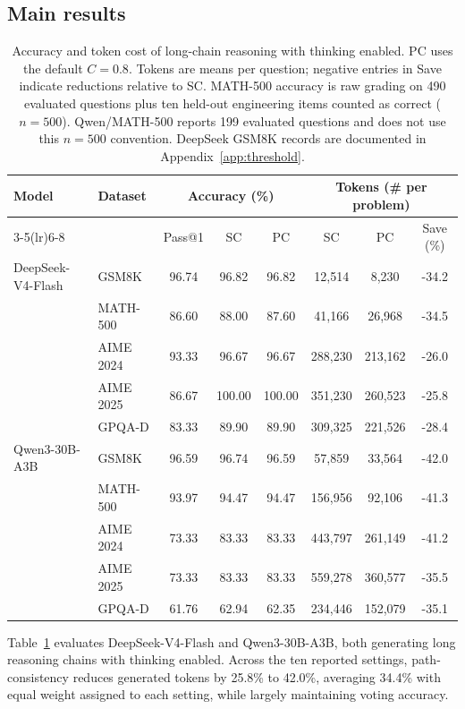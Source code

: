\subsection{Main results}
\label{sec:main_results}
\begin{table}[htbp]
\centering
\caption{Accuracy and token cost of long-chain reasoning with thinking enabled. PC uses the default $C=0.8$. Tokens are means per question; negative entries in Save indicate reductions relative to SC. MATH-500 accuracy is raw grading on 490 evaluated questions plus ten held-out engineering items counted as correct ($n=500$). Qwen/MATH-500 reports 199 evaluated questions and does not use this $n=500$ convention. DeepSeek GSM8K records are documented in Appendix~\ref{app:threshold}.}
\label{tab:main}
\setlength{\tabcolsep}{5pt}
\begin{tabular}{llcccccc}
\toprule
Model & Dataset & \multicolumn{3}{c}{Accuracy (\%)} & \multicolumn{3}{c}{Tokens (\# per problem)}\\
\cmidrule(lr){3-5}\cmidrule(lr){6-8}
 & & Pass@1 & SC & PC & SC & PC & Save (\%)\\
\midrule
DeepSeek-V4-Flash  & GSM8K & 96.74 & 96.82 & 96.82 & 12,514 & 8,230 & -34.2 \\
& MATH-500 & 86.60 & 88.00 & 87.60 & 41,166 & 26,968 & -34.5 \\
 & AIME 2024 & 93.33 & 96.67 & 96.67 & 288,230 & 213,162 & -26.0 \\
 & AIME 2025 & 86.67 & 100.00 & 100.00 & 351,230 & 260,523 & -25.8 \\
 & GPQA-D & 83.33 & 89.90 & 89.90 & 309,325 & 221,526 & -28.4 \\

\midrule
Qwen3-30B-A3B & GSM8K & 96.59 & 96.74 & 96.59 & 57,859 & 33,564 & -42.0 \\
& MATH-500 & 93.97 & 94.47 & 94.47 & 156,956 & 92,106 & -41.3 \\
 & AIME 2024 & 73.33 & 83.33 & 83.33 & 443,797 & 261,149 & -41.2 \\
 & AIME 2025 & 73.33 & 83.33 & 83.33 & 559,278 & 360,577 & -35.5 \\
 & GPQA-D & 61.76 & 62.94 & 62.35 & 234,446 & 152,079 & -35.1\\
\bottomrule
\end{tabular}
\end{table}

Table~\ref{tab:main} evaluates DeepSeek-V4-Flash and Qwen3-30B-A3B, both generating long reasoning chains with thinking enabled. Across the ten reported settings, path-consistency reduces generated tokens by 25.8\% to 42.0\%, averaging 34.4\% with equal weight assigned to each setting, while largely maintaining voting accuracy.

